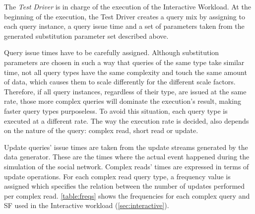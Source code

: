 The \emph{Test Driver} is in charge of the execution of the Interactive Workload.
At the beginning of the execution, the Test Driver creates a query mix by
assigning to each query instance, a query issue time and a set of parameters
taken from the generated substitution parameter set described above.  

Query issue times have to be carefully assigned.  Although substitution
parameters are chosen in such a way that queries of the same type take similar
time, not all query types have the same complexity and touch the same amount of
data, which causes them to scale differently for the different scale factors.
Therefore, if all query instances, regardless of their type, are issued
at the same rate, those more complex queries will dominate the execution's
result, making faster query types purposeless. To avoid this situation, each
query type is executed at a different rate. The way the execution rate is decided,
also depends on the nature of the query: complex read, short read or update.

Update queries' issue times are taken from the update streams generated by the
data generator. These are the times where the actual event happened during the
simulation of the social network. Complex reads' times are expressed in terms
of update operations. For each complex read query type, a frequency value is
assigned which specifies the relation between the number of updates performed
per complex read. \autoref{table:freqs} shows the frequencies for each complex query and SF used in the Interactive workload (\autoref{sec:interactive}).




